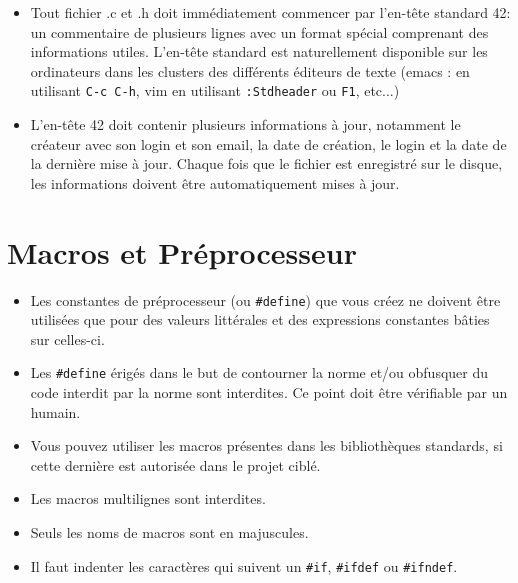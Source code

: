 \documentclass{42-fr}
\begin{document}
    \begin{itemize}

    \item Tout fichier .c et .h doit immédiatement commencer par l'en-tête standard 42: 
    un commentaire de plusieurs lignes avec un format spécial comprenant des informations utiles. 
    L'en-tête standard est naturellement disponible sur les ordinateurs dans les clusters des différents éditeurs de texte 
    (emacs : en utilisant \texttt{C-c C-h}, vim en utilisant \texttt{:Stdheader} ou \texttt{F1}, etc...)

    \item L'en-tête 42 doit contenir plusieurs informations à jour, notamment le créateur avec son login et son email, 
    la date de création, le login et la date de la dernière mise à jour. 
    Chaque fois que le fichier est enregistré sur le disque, les informations doivent être automatiquement mises à jour.

    \end{itemize}
    \newpage


    \section{Macros et Préprocesseur}

        \begin{itemize}

            \item Les constantes de préprocesseur (ou \texttt{\#define}) que vous créez ne doivent
                être utilisées que pour des valeurs littérales et des expressions constantes
                bâties sur celles-ci.
            \item Les \texttt{\#define} érigés dans le but de contourner la norme et/ou obfusquer
                du code interdit par la norme sont interdites. 
                Ce point doit être vérifiable par un humain.
            \item Vous pouvez utiliser les macros présentes dans les bibliothèques standards,
                si cette dernière est autorisée dans le projet ciblé.
            \item Les macros multilignes sont interdites.
            \item Seuls les noms de macros sont en majuscules.
            \item Il faut indenter les caractères qui suivent un \texttt{\#if}, \texttt{\#ifdef}
                ou \texttt{\#ifndef}.

        \end{itemize}
        \newpage
\end{document}
